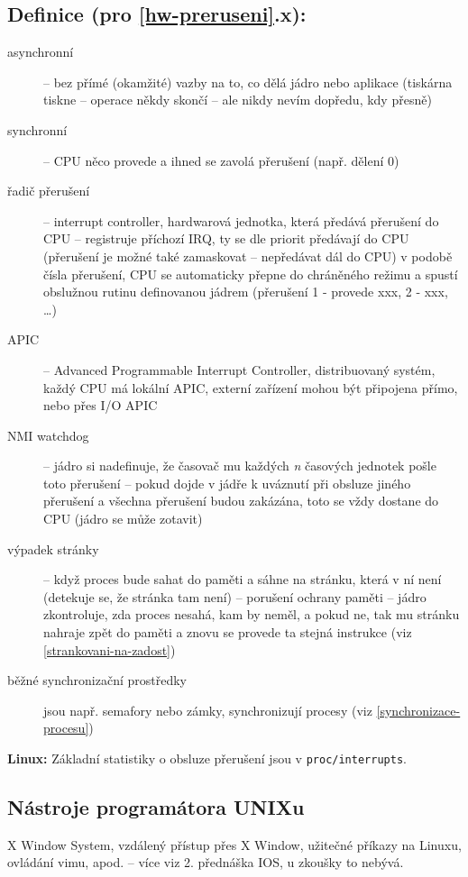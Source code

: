 \documentclass[a4paper, 11pt]{article}
\begin{document}
\subsection*{Definice (pro \ref{hw-preruseni}.x):}
\begin{description}
\item[asynchronní] -- bez přímé (okamžité) vazby na to, co dělá jádro nebo aplikace (tiskárna tiskne -- operace někdy skončí -- ale nikdy nevím dopředu, kdy přesně)

\item[synchronní] -- CPU něco provede a ihned se zavolá přerušení (např. dělení 0)

\item[řadič přerušení] -- interrupt controller, hardwarová jednotka, která předává přerušení do CPU -- registruje příchozí IRQ, ty se dle priorit předávají do CPU (přerušení je možné také zamaskovat -- nepředávat dál do CPU) v podobě čísla přerušení, CPU se automaticky přepne do chráněného režimu a spustí obslužnou rutinu definovanou jádrem (přerušení 1 - provede xxx, 2 - xxx, \ldots)

\item[APIC] -- Advanced Programmable Interrupt Controller, distribuovaný systém, každý CPU má lokální APIC, externí zařízení mohou být připojena přímo, nebo přes I/O APIC

\item[NMI watchdog] -- jádro si nadefinuje, že časovač mu každých \emph{n} časových jednotek pošle toto přerušení -- pokud dojde v jádře k uváznutí při obsluze jiného přerušení a všechna přerušení budou zakázána, toto se vždy dostane do CPU (jádro se může zotavit)

\item[výpadek stránky] -- když proces bude sahat do paměti a sáhne na stránku, která v ní není (detekuje se, že stránka tam není) -- porušení ochrany paměti -- jádro zkontroluje, zda proces nesahá, kam by neměl, a pokud ne, tak mu stránku nahraje zpět do paměti a znovu se provede ta stejná instrukce (viz \ref{strankovani-na-zadost})

\item[běžné synchronizační prostředky] jsou např. semafory nebo zámky, synchronizují procesy (viz \ref{synchronizace-procesu})
\end{description}

\textbf{Linux:}
Základní statistiky o obsluze přerušení jsou v \verb|proc/interrupts|.

\subsection{Nástroje programátora UNIXu}
X Window System, vzdálený přístup přes X Window, užitečné příkazy na Linuxu, ovládání vimu, apod. -- více viz 2. přednáška IOS, u zkoušky to nebývá.
\end{document}
